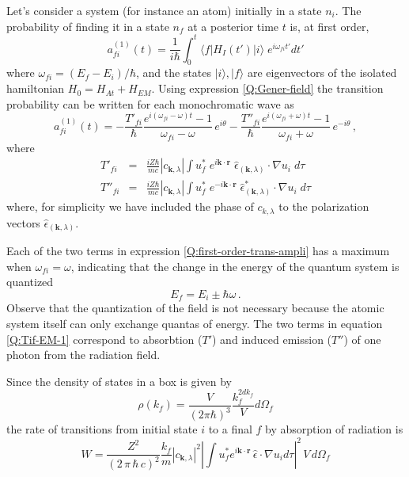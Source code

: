 Let's consider a system (for instance an atom) initially in a state $n_{i}$. The probability of finding it in a state $n_{f}$ at a posterior time $t$ is, at first order,
\begin{equation}\label{Q:first-order-trans-ampli}
a_{fi}^{(1)}(t) = \frac{1}{i \hbar} \int_{0}^{t} \langle
f|H_{I}(t')| i \rangle \; e^{i \omega_{fi} t'} d t'
\end{equation}
where $\omega_{fi} = (E_{f}-E_{i})/\hbar$, and the states $| i\rangle, | f\rangle$ are eigenvectors of the isolated hamiltonian $H_{0} = H_{At} + H_{EM}$. Using expression \ref{Q:Gener-field} the transition probability can be written for each monochromatic wave as
\begin{equation}\label{Q:first-order-trans-ampli-1}
a_{fi}^{(1)}(t) = - \frac{T'_{fi}}{\hbar} \frac{e^{i (\omega_{fi}-\omega)t} -1}{\omega_{fi} - \omega} \, e^{i \theta}
- \frac{T''_{fi}}{\hbar} \frac{e^{i (\omega_{fi} + \omega)t} -1}{\omega_{fi} + \omega} \, e^{- i \theta} \,,
\end{equation}
%
where
\begin{eqnarray} \label{Q:Tif-EM-1}
T'_{fi} &=& \frac{i Z \hbar}{m c} |c_{\bm{k},\lambda}| \int u^{*}_{f} \; e^{i \bm{k} \cdot \bm{r}} \;
\hat{\epsilon}_{(\bm{k},\lambda)}  \cdot \nabla u_{i} \; d \tau
\\
T''_{fi} &=& \frac{i Z \hbar}{m c} |c_{\bm{k},\lambda}| \int u^{*}_{f} \; e^{- i \bm{k} \cdot \bm{r}} \;
\hat{\epsilon}_{(\bm{k},\lambda)}^{*} \cdot \nabla u_{i} \; d \tau
\end{eqnarray}
where, for simplicity we have included the phase of $c_{k,\lambda}$ to the polarization vectors $\hat{\epsilon}_{(\bm{k},\lambda)}$.

Each of the two terms in expression \ref{Q:first-order-trans-ampli} has a maximum when $\omega_{fi} = \omega $, indicating that the change in the energy of the quantum system is quantized
%
\[ E_{f} = E_{i} \pm \hbar \omega \,. \]
%
Observe that the quantization of the field is not necessary because the atomic system itself can only exchange quantas of energy. The two terms in equation \ref{Q:Tif-EM-1} correspond to absorbtion ($T'$) and induced emission ($T''$) of one photon from the radiation field.

Since the density of states in a box is given by
\begin{equation}\label{Q:Densi-state}
\rho ( k_{f}) = \frac{V}{(2 \pi \hbar)^{3}}\frac{k_{f}^{2 d
k_{f}}}{V} d \Omega_{f}
\end{equation}
%
the rate of transitions from initial state $i$ to a final $f$ by absorption of radiation is
\begin{equation}\label{Q:Trans-Rate}
W = \frac{Z^{2}}{(2\, \pi \, \hbar \, c)^{2}} \frac{k_{f}}{m}
|c_{\bm{k}, \lambda}|^{2}
  \left|\int
u_{f}^{*} e^{i \bm{k} \cdot \bm{r}} \, \hat{\epsilon} \cdot
\nabla u_{i} d \tau \right|^{2} \, V \,d \Omega_{f}
\end{equation}

